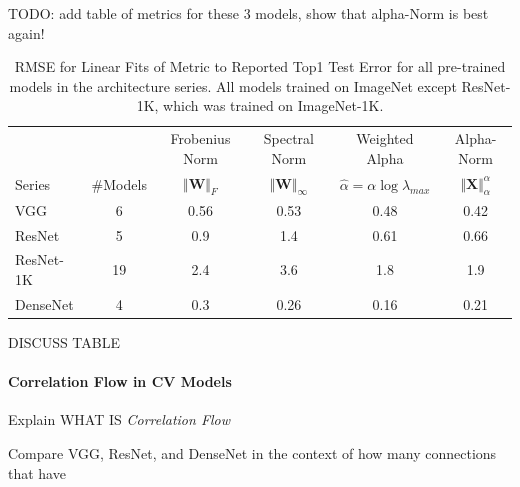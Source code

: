TODO:  add table of metrics for these 3 models, show that alpha-Norm is best again!

\begin{table}[t]
\small
\begin{center}
\begin{tabular}{|p{1in}|c|c|c|c|c|}
\hline
   &    & Frobenius Norm & Spectral Norm & Weighted Alpha & Alpha-Norm \\
 Series & \#Models   & $\Vert\mathbf{W}\Vert_{F}$ & $\Vert\mathbf{W}\Vert_{\infty}$ & $\hat{\alpha}=\alpha\log\lambda_{max}$ & $\Vert\mathbf{X}\Vert^{\alpha}_{\alpha}$ \\
\hline
 VGG & 6 & 0.56 & 0.53 & 0.48 & 0.42  \\
 ResNet & 5 & 0.9 & 1.4 & 0.61 & 0.66  \\
 ResNet-1K & 19 & 2.4 & 3.6 & 1.8 & 1.9  \\
 DenseNet & 4 & 0.3 & 0.26 & 0.16 & 0.21 \\
\hline
\end{tabular}
\end{center}
\caption{RMSE for Linear Fits of Metric to Reported Top1 Test Error for all pre-trained models in the architecture series.  All models trained on ImageNet except ResNet-1K, which was trained on ImageNet-1K. }
\label{table:models}
\end{table}

DISCUSS TABLE



\paragraph{Correlation Flow in CV Models}

Explain WHAT IS \emph{Correlation Flow}

Compare VGG, ResNet, and DenseNet in the context of how many connections that have

